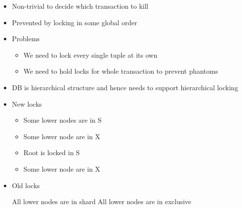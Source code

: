 \begin{itemize}
\begin{itemize}
\begin{itemize}
                    \item Non-trivial to decide which transaction to kill
                    \item Prevented by locking in some global order
                \end{itemize}
        \end{itemize}
        \begin{itemize}
            \item Problems
                \begin{itemize}
                    \item We need to lock every single tuple at its own
                    \item We need to hold locks for whole transaction to prevent phantoms
                \end{itemize}
            \item DB is hierarchical structure and hence needs to support hierarchical locking
            \item New locks
                \begin{itemize}
                        \begin{itemize}
                            \item Some lower nodes are in S
                        \end{itemize}
                        \begin{itemize}
                            \item Some lower node are in X
                        \end{itemize}
                        \begin{itemize}
                            \item Root is locked in S
                            \item Some lower node are in X
                        \end{itemize}
                \end{itemize}
            \item Old locks
                \begin{itemize}
                     All lower nodes are in shard
                     All lower nodes are in exclusive
                \end{itemize}

\end{itemize}
\end{itemize}

